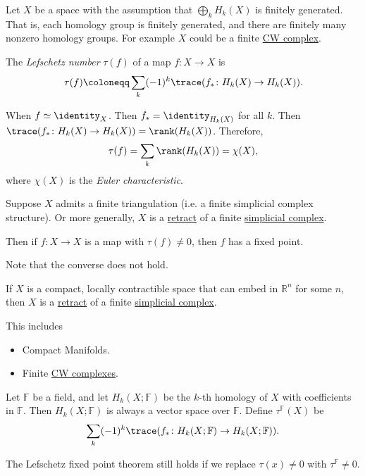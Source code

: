 \begin{definition}\label{def:Lefschetz-number}
	Let \(X\) be a space with the assumption that \(\bigoplus_k H_k(X)\) is finitely generated. That is, each homology group is finitely
	generated, and there are finitely many nonzero homology groups. For example \(X\) could be a finite \hyperref[def:CW-Complex]{CW complex}.

	The \emph{Lefschetz number} \(\tau(f)\) of a map \(f \colon X \to X\) is
	\[
		\tau(f) \coloneqq \sum_k (-1)^k \trace(f_\ast \colon H_k(X) \to H_k(X)).
	\]
\end{definition}

\begin{eg}
	When \(f \simeq \identity _X\). Then \(f_\ast = \identity_{H_k(X)}\) for all \(k\). Then \(\trace(f_\ast \colon H_k(X) \to H_k(X)) = \rank(H_k(X))\).
	Therefore,
	\[
		\tau(f) = \sum_k \rank(H_k(X)) = \chi(X),
	\]
	where \(\chi(X)\) is the \emph{Euler characteristic}.
\end{eg}

\begin{theorem}\label{thm:Lefschetz-fixed-point}
	Suppose \(X\) admits a finite triangulation (i.e. a finite simplicial complex structure). Or more generally, \(X\) is a
	\hyperref[def:retraction]{retract} of a finite \hyperref[def:simplicial-complex]{simplicial complex}.

	Then if \(f \colon X \to X\) is a map with \(\tau(f) \neq 0\), then \(f\) has a fixed point.
\end{theorem}
\begin{note}
	Note that the converse does not hold.
\end{note}
\begin{theorem}[]\label{thm:retract-simplicial-complex}
	If \(X\) is a compact, locally contractible space that can embed in \(\mathbb{R}^n\) for some \(n\), then \(X\) is a
	\hyperref[def:retraction]{retract} of a finite \hyperref[def:simplicial-complex]{simplicial complex}.

	This includes
	\begin{itemize}
		\item Compact Manifolds.
		\item Finite \hyperref[def:CW-Complex]{CW complexes}.
	\end{itemize}
\end{theorem}

\begin{definition}\label{def:Lefschetz-number-better}
	Let \(\mathbb{F}\) be a field, and let \(H_k(X; \mathbb{F})\) be the \(k\)-th homology of \(X\) with coefficients in \(\mathbb{F}\).
	Then \(H_k(X; \mathbb{F})\) is always a vector space over \(\mathbb{F}\). Define \(\tau^{\mathbb{F}}(X)\) be
	\[
		\sum_k (-1)^k \trace(f_\ast \colon H_k(X; \mathbb{F}) \to H_k(X; \mathbb{F})).
	\]

	The Lefschetz fixed point theorem still holds if we replace \(\tau(x) \neq 0\) with \(\tau^{\mathbb{F}} \neq 0\).
\end{definition}

